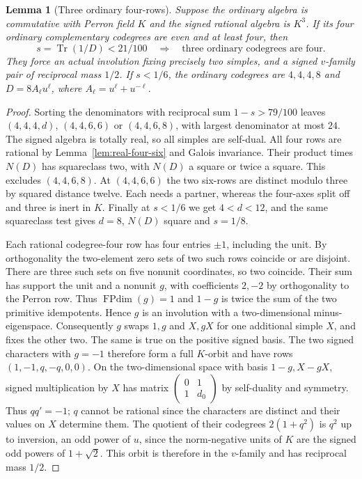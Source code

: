 \documentclass[11pt,reqno]{amsart}
\newtheorem{lemma}[theorem]{Lemma}
\theoremstyle{remark}\newtheorem{remark}[theorem]{Remark}
\numberwithin{equation}{section}
\begin{document}
\begin{lemma}[Three ordinary four-rows]\label{lem:silver-three-four-rows}
Suppose the ordinary algebra is commutative with Perron field $K$
and the signed rational algebra is $K^3$. If its four ordinary
complementary codegrees are even and at least four, then
\[
 s=\operatorname{Tr}(1/D)<21/100
 \quad\Longrightarrow\quad
 \text{three ordinary codegrees are four}.
\]
They force an actual involution fixing precisely two simples, and a
signed $v$-family pair of reciprocal mass $1/2$. If $s<1/6$, the
ordinary codegrees are $4,4,4,8$ and $D=8A_\ell u^\ell$, where
$A_\ell=u^\ell+u^{-\ell}$.
\end{lemma}
\begin{proof}
Sorting the denominators with reciprocal sum $1-s>79/100$ leaves
$(4,4,4,d)$, $(4,4,6,6)$ or $(4,4,6,8)$, with largest denominator at most $24$.
The signed algebra is totally real, so all simples are self-dual.
All four rows are rational by Lemma~\ref{lem:real-four-six} and
Galois invariance. Their product times $N(D)$ has squareclass
two, with $N(D)$ a square or twice a square. This excludes
$(4,4,6,8)$. At $(4,4,6,6)$ the two six-rows are distinct
modulo three by squared distance twelve. Each needs a partner,
whereas the four-axes split off and three is inert in $K$.
Finally at $s<1/6$ we get $4<d<12$, and the same squareclass
test gives $d=8$, $N(D)$ square and $s=1/8$.

Each rational codegree-four row has four entries $\pm1$, including
the unit. By orthogonality the two-element zero sets of two such
rows coincide or are disjoint. There are three such sets on five
nonunit coordinates, so two coincide. Their sum has support the
unit and a nonunit $g$, with coefficients $2,-2$ by orthogonality
to the Perron row. Thus $\operatorname{FPdim}(g)=1$ and
$1-g$ is twice the sum of the two primitive idempotents. Hence $g$
is an involution with a two-dimensional minus-eigenspace. Consequently $g$ swaps $1,g$ and $X,gX$ for
one additional simple $X$, and fixes the other two. The same is true
on the positive signed basis. The two signed characters with $g=-1$
therefore form a full $K$-orbit and have rows
$(1,-1,q,-q,0,0)$. On the two-dimensional space with basis
$1-g,X-gX$, signed multiplication by $X$ has matrix
$\left(\begin{smallmatrix}0&1\\1&d_0\end{smallmatrix}\right)$ by
self-duality and symmetry. Thus $qq'=-1$; $q$ cannot be rational
since the characters are distinct and their values on $X$ determine
them. The quotient of their codegrees $2(1+q^2)$ is $q^2$ up to
inversion, an odd power of $u$, since the norm-negative units of
$K$ are the signed odd powers of $1+\sqrt2$. This orbit is therefore
in the $v$-family and has reciprocal mass $1/2$.
\end{proof}
\end{document}
